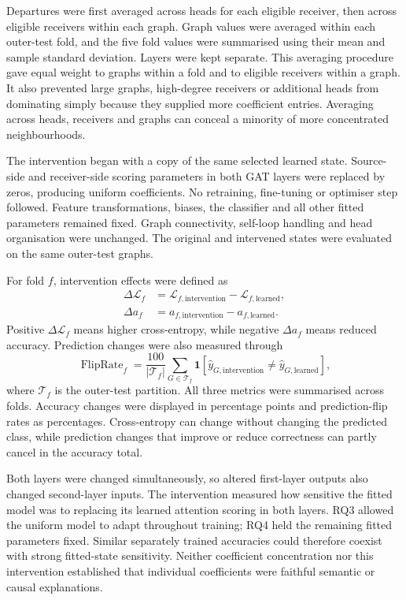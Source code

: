 \documentclass[11pt,a4paper]{article}
\begin{document}
Departures were first averaged across heads for each eligible receiver, then across eligible receivers within each graph. Graph values were averaged within each outer-test fold, and the five fold values were summarised using their mean and sample standard deviation. Layers were kept separate. This averaging procedure gave equal weight to graphs within a fold and to eligible receivers within a graph. It also prevented large graphs, high-degree receivers or additional heads from dominating simply because they supplied more coefficient entries. Averaging across heads, receivers and graphs can conceal a minority of more concentrated neighbourhoods.

The intervention began with a copy of the same selected learned state. Source-side and receiver-side scoring parameters in both GAT layers were replaced by zeros, producing uniform coefficients. No retraining, fine-tuning or optimiser step followed. Feature transformations, biases, the classifier and all other fitted parameters remained fixed. Graph connectivity, self-loop handling and head organisation were unchanged. The original and intervened states were evaluated on the same outer-test graphs.

For fold \(f\), intervention effects were defined as
\[
\begin{aligned}
\Delta\mathcal{L}_f
&=\mathcal{L}_{f,\mathrm{intervention}}-\mathcal{L}_{f,\mathrm{learned}},\\
\Delta a_f
&=a_{f,\mathrm{intervention}}-a_{f,\mathrm{learned}}.
\end{aligned}
\]
Positive \(\Delta\mathcal{L}_f\) means higher cross-entropy, while negative \(\Delta a_f\) means reduced accuracy. Prediction changes were also measured through
\[
\operatorname{FlipRate}_f
=\frac{100}{|\mathcal{T}_f|}
\sum_{G\in\mathcal{T}_f}
\mathbf{1}\!\left[
\widehat{y}_{G,\mathrm{intervention}}
\neq\widehat{y}_{G,\mathrm{learned}}
\right],
\]
where \(\mathcal{T}_f\) is the outer-test partition. All three metrics were summarised across folds. Accuracy changes were displayed in percentage points and prediction-flip rates as percentages. Cross-entropy can change without changing the predicted class, while prediction changes that improve or reduce correctness can partly cancel in the accuracy total.

Both layers were changed simultaneously, so altered first-layer outputs also changed second-layer inputs. The intervention measured how sensitive the fitted model was to replacing its learned attention scoring in both layers. RQ3 allowed the uniform model to adapt throughout training; RQ4 held the remaining fitted parameters fixed. Similar separately trained accuracies could therefore coexist with strong fitted-state sensitivity. Neither coefficient concentration nor this intervention established that individual coefficients were faithful semantic or causal explanations.
\end{document}

